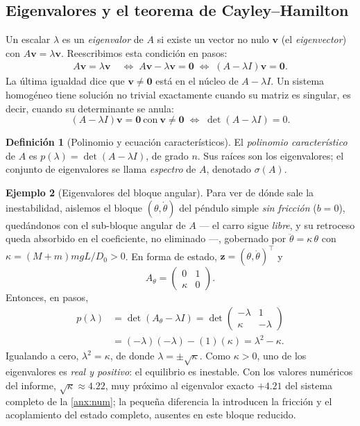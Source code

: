 \documentclass[11pt,letterpaper]{article}
\theoremstyle{definition}
\newtheorem{definicion}{Definición}[section]
\newtheorem{ejemplo}[definicion]{Ejemplo}
\theoremstyle{plain}
\theoremstyle{remark}
\begin{document}
\subsection{Eigenvalores y el teorema de Cayley--Hamilton}
\label{sub:eig}

Un escalar $\lambda$ es un
\emph{eigenvalor} de $A$ si existe un vector no nulo $\bm v$ (el
\emph{eigenvector}) con $A\bm v=\lambda\bm v$. Reescribimos esta
condición en pasos:
\begin{align}
  A\bm v=\lambda\bm v
  \;&\Longleftrightarrow\; A\bm v-\lambda\bm v=\bm 0
  \;\Longleftrightarrow\; (A-\lambda I)\bm v=\bm 0. \label{eq:eig1}
\end{align}
La última igualdad dice que $\bm v\neq\bm 0$ está en el núcleo de
$A-\lambda I$. Un sistema homogéneo tiene solución no trivial exactamente
cuando su matriz es singular, es decir, cuando su determinante se anula:
\begin{equation}\label{eq:chareq}
  (A-\lambda I)\bm v=\bm 0\ \text{con}\ \bm v\neq\bm 0
  \;\Longleftrightarrow\; \det(A-\lambda I)=0.
\end{equation}

\begin{definicion}[Polinomio y ecuación característicos]
\label{def:charpoly}
El \emph{polinomio característico} de $A$ es
$p(\lambda)=\det(A-\lambda I)$, de grado $n$. Sus raíces son los
eigenvalores; el conjunto de eigenvalores se llama \emph{espectro} de
$A$, denotado $\sigma(A)$.
\end{definicion}

\begin{ejemplo}[Eigenvalores del bloque angular]
\label{ej:eig}
Para ver de dónde sale la inestabilidad, aislemos el bloque
$(\theta,\dot\theta)$ del péndulo simple \emph{sin fricción} ($b=0$),
quedándonos con el sub-bloque angular de $A$ --- el carro sigue
\emph{libre}, y su retroceso queda absorbido en el coeficiente, no
eliminado ---, gobernado por
$\ddot\theta=\kappa\,\theta$ con $\kappa=(M{+}m)mgL/D_0>0$. En forma de
estado, $\bm z=(\theta,\dot\theta)^\top$ y
\begin{equation*}
  A_\theta=\begin{pmatrix}0&1\\\kappa&0\end{pmatrix}.
\end{equation*}
Entonces, en pasos,
\begin{align*}
  p(\lambda)&=\det(A_\theta-\lambda I)
   =\det\!\begin{pmatrix}-\lambda&1\\\kappa&-\lambda\end{pmatrix}\\
   &=(-\lambda)(-\lambda)-(1)(\kappa)=\lambda^2-\kappa.
\end{align*}
Igualando a cero, $\lambda^2=\kappa$, de donde
$\lambda=\pm\sqrt{\kappa}$. Como $\kappa>0$, uno de los eigenvalores es
\emph{real y positivo}: el equilibrio es inestable. Con los valores
numéricos del informe, $\sqrt{\kappa}\approx 4.22$, muy próximo al
eigenvalor exacto $+4.21$ del sistema completo de la \cref{anx:num}; la
pequeña diferencia la introducen la fricción y el acoplamiento del estado
completo, ausentes en este bloque reducido.
\end{ejemplo}
\end{document}

